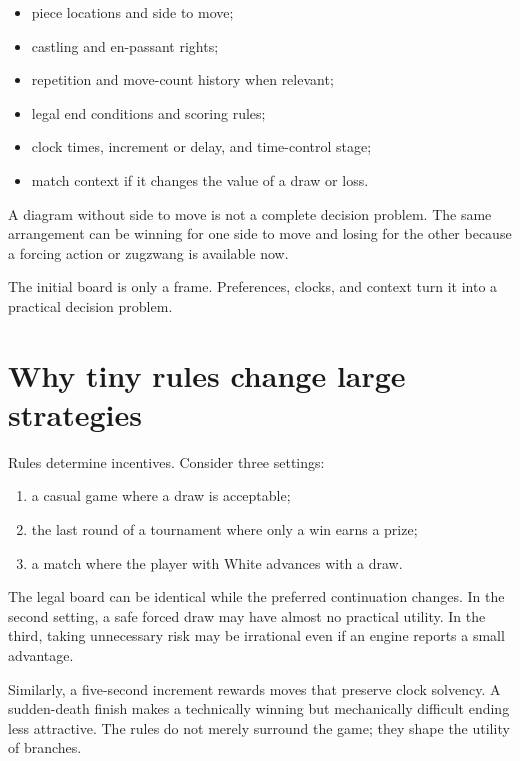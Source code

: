 \begin{itemize}[leftmargin=1.4em]
\item piece locations and side to move;
\item castling and en-passant rights;
\item repetition and move-count history when relevant;
\item legal end conditions and scoring rules;
\item clock times, increment or delay, and time-control stage;
\item match context if it changes the value of a draw or loss.
\end{itemize}

A diagram without side to move is not a complete decision problem. The same arrangement can be winning for one side to move and losing for the other because a forcing action or zugzwang is available now.

\begin{positiondiagram}{The initial board is only a frame. Preferences, clocks, and context turn it into a practical decision problem.}
\StartingPieces
\end{positiondiagram}

\section{Why tiny rules change large strategies}
Rules determine incentives. Consider three settings:

\begin{enumerate}[label=\alph*)]
\item a casual game where a draw is acceptable;
\item the last round of a tournament where only a win earns a prize;
\item a match where the player with White advances with a draw.
\end{enumerate}

The legal board can be identical while the preferred continuation changes. In the second setting, a safe forced draw may have almost no practical utility. In the third, taking unnecessary risk may be irrational even if an engine reports a small advantage.

Similarly, a five-second increment rewards moves that preserve clock solvency. A sudden-death finish makes a technically winning but mechanically difficult ending less attractive. The rules do not merely surround the game; they shape the utility of branches.

